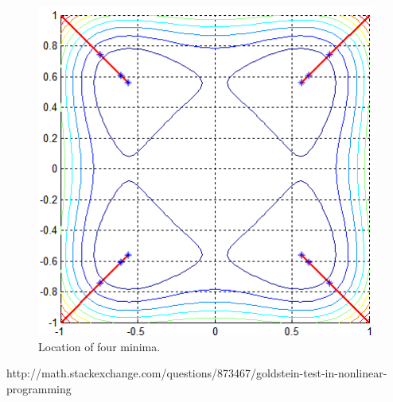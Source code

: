 \documentclass[12pt]{article}
\begin{document}
	\begin{figure}[H]
		\includegraphics[width=16cm]{four_results.png}
		\caption{Location of four minima.}
	\end{figure}
	
\begin{thebibliography}{99}
 http://math.stackexchange.com/questions/873467/goldstein-test-in-nonlinear-programming
\end{thebibliography}
	
	
\end{document}
